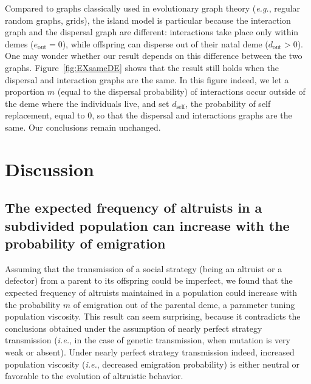 \documentclass[11pt, letterpaper]{article}
\newcommand{\ie}{\textit{i.e.}}
\newcommand{\eg}{\textit{e.g.}}
\newcommand{\self}{\textrm{self}}
\newcommand{\out}{\textrm{out}}
\newcommand{\eout}{e_{\out}}
\newcommand{\dself}{d_{\self}}
\newcommand{\dout}{d_{\out}}
\begin{document}
Compared to graphs classically used in evolutionary graph theory (\eg, regular random graphs, grids), the island model is particular because the interaction graph and the dispersal graph are different: interactions take place only within demes ($\eout = 0$), while offspring can disperse out of their natal deme ($\dout >0$). One may wonder whether our result depends on this difference between the two graphs. Figure~\ref{fig:EXsameDE} shows that the result still holds when the dispersal and interaction graphs are the same. In this figure indeed, we let a proportion $m$ (equal to the dispersal probability) of interactions occur outside of the deme where the individuals live, and set $\dself$, the probability of self replacement, equal to $0$, so that the dispersal and interactions graphs are the same. Our conclusions remain unchanged.



\section{Discussion}
\subsection*{The expected frequency of altruists in a subdivided population can increase with the probability of emigration}
Assuming that the transmission of a social strategy (being an altruist or a defector) from a parent to its offspring could be imperfect, we found that the expected frequency of altruists maintained in a population could increase with the probability $m$ of emigration out of the parental deme, a parameter tuning population viscosity. This result can seem surprising, because it contradicts the conclusions obtained under the assumption of nearly perfect strategy transmission (\ie, in the case of genetic transmission, when mutation is very weak or absent). Under nearly perfect strategy transmission indeed, increased population viscosity (\ie, decreased emigration probability) is either neutral \citep[][and dashed lines in figures~\ref{fig:EX}--]{Taylor1992islandmodel} or favorable \citep[][and dashed lines in figure~\ref{fig:EX}]{TaylorDayWild2007} to the evolution of altruistic behavior. 
\end{document}
